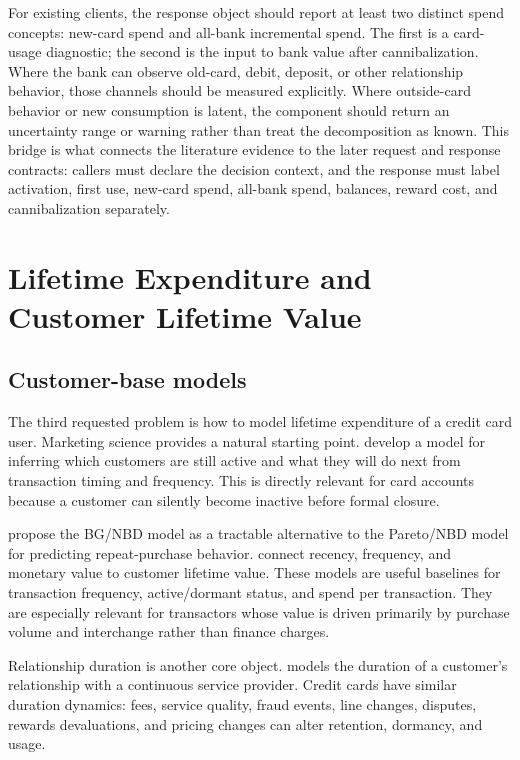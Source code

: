 \documentclass[11pt]{article}
\newcommand{\1}{\mathbf{1}}
\begin{document}
For existing clients, the response object should report at least two distinct
spend concepts: new-card spend and all-bank incremental spend. The first is a
card-usage diagnostic; the second is the input to bank value after
cannibalization. Where the bank can observe old-card, debit, deposit, or other
relationship behavior, those channels should be measured explicitly. Where
outside-card behavior or new consumption is latent, the component should return
an uncertainty range or warning rather than treat the decomposition as known.
This bridge is what connects the literature evidence to the later request and
response contracts: callers must declare the decision context, and the response
must label activation, first use, new-card spend, all-bank spend, balances,
reward cost, and cannibalization separately.

\section{Lifetime Expenditure and Customer Lifetime Value}
\label{sec:ltv}

\subsection{Customer-base models}

The third requested problem is how to model lifetime expenditure of a credit
card user. Marketing science provides a natural starting point. \citet{schmittlein1987counting}
develop a model for inferring which customers are still active and what they
will do next from transaction timing and frequency. This is directly relevant
for card accounts because a customer can silently become inactive before formal
closure.

\citet{fader2005bgnbd} propose the BG/NBD model as a tractable alternative to
the Pareto/NBD model for predicting repeat-purchase behavior.
\citet{fader2005rfm} connect recency, frequency, and monetary value to customer
lifetime value. These models are useful baselines for transaction frequency,
active/dormant status, and spend per transaction. They are especially relevant
for transactors whose value is driven primarily by purchase volume and
interchange rather than finance charges.

Relationship duration is another core object. \citet{bolton1998duration} models
the duration of a customer's relationship with a continuous service provider.
Credit cards have similar duration dynamics: fees, service quality, fraud
events, line changes, disputes, rewards devaluations, and pricing changes can
alter retention, dormancy, and usage.
\end{document}
